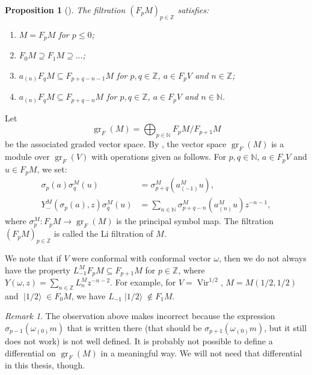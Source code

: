 \documentclass[a4paper, 12pt, reqno]{amsart}
\newtheorem{proposition}[theorem]{Proposition}
\theoremstyle{remark}
\newtheorem{remark}[theorem]{Remark}
\numberwithin{equation}{subsection}
\DeclareMathOperator{\Vir}{Vir}
\DeclareMathOperator{\gr}{gr}
\DeclareMathOperator{\vachalf}{|1/2\rangle}
\begin{document}
\begin{proposition}[{\cite{li_abelianizing_2005}}]
  \label{prp:13}
  The filtration $(F_pM)_{p \in \mathbb{Z}}$ satisfies:
  \begin{enumerate}
  \item $M = F_pM$ for $p \le 0$;
  \item $F_0M \supseteq F_1M \supseteq \dots$;
  \item $a_{(n)}F_qM \subseteq F_{p + q - n - 1}M$ for $p, q \in \mathbb{Z}$, $a \in F_pV$ and $n \in \mathbb{Z}$;
  \item $a_{(n)}F_qM \subseteq F_{p + q - n}M$ for $p, q \in \mathbb{Z}$, $a \in F_pV$ and $n \in \mathbb{N}$.
  \end{enumerate}
\end{proposition}

Let
\begin{equation*}
  \gr_F(M) = \bigoplus_{p \in \mathbb{N}}F_pM/F_{p + 1}M
\end{equation*}
be the associated graded vector space.
By \cite{li_abelianizing_2005}, the vector space $\gr_F(M)$ is a module over $\gr_F(V)$ with operations given as follows.
For $p, q \in \mathbb{N}$, $a \in F_pV$ and $u \in F_pM$, we set:
\begin{align*}
  \sigma_p(a)\sigma^M_q(u) &= \sigma^M_{p + q}(a^M_{(-1)}u), \\
  Y^M_-(\sigma_p(a), z)\sigma^M_q(u) &= \sum_{n \in \mathbb{N}}\sigma^M_{p + q - n}(a^M_{(n)}u)z^{-n - 1},
\end{align*}
where $\sigma^M_p: F_pM \to \gr_F(M)$ is the principal symbol map.
The filtration $(F_pM)_{p \in \mathbb{Z}}$ is called the Li filtration of $M$.

We note that if $V$ were conformal with conformal vector $\omega$, then we do not always have the property $L_{-1}^MF_pM \subseteq F_{p + 1}M$ for $p \in \mathbb{Z}$, where $Y(\omega, z) = \sum_{n \in \mathbb{Z}}L^M_nz^{-n - 2}$.
For example, for $V = \Vir^{1/2}$, $M = M(1/2, 1/2)$ and $\vachalf \in F_0M$, we have $L_{-1}\vachalf \notin F_1M$.

\begin{remark}
  \label{rmk:39}
  The observation above makes \cite[Lemma 3.1.2]{arakawa_remark_2012} incorrect because the expression $\sigma_{p - 1}(\omega_{(0)}m)$ that is written there (that should be $\sigma_{p + 1}(\omega_{(0)}m)$, but it still does not work) is not well defined.
  It is probably not possible to define a differential on $\gr_F(M)$ in a meaningful way.
  We will not need that differential in this thesis, though.
\end{remark}
\end{document}
